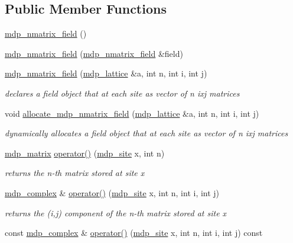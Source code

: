 \subsection*{Public Member Functions}
\begin{DoxyCompactItemize}
\item 
\hyperlink{classmdp__nmatrix__field_a2431fcb07b72317d2bf87e46ddad80b1}{mdp\_\-nmatrix\_\-field} ()
\item 
\hyperlink{classmdp__nmatrix__field_a8a3db6bfa6ffc2a5679c24f3e297e0c4}{mdp\_\-nmatrix\_\-field} (\hyperlink{classmdp__nmatrix__field}{mdp\_\-nmatrix\_\-field} \&field)
\item 
\hyperlink{classmdp__nmatrix__field_a10d00272d103d471a1cd9e5921d39419}{mdp\_\-nmatrix\_\-field} (\hyperlink{classmdp__lattice}{mdp\_\-lattice} \&a, int n, int i, int j)
\begin{DoxyCompactList}\small\item\em declares a field object that at each site as vector of n ixj matrices \item\end{DoxyCompactList}\item 
void \hyperlink{classmdp__nmatrix__field_ad8803e7b0f9a755329a1d7335ac0c019}{allocate\_\-mdp\_\-nmatrix\_\-field} (\hyperlink{classmdp__lattice}{mdp\_\-lattice} \&a, int n, int i, int j)
\begin{DoxyCompactList}\small\item\em dynamically allocates a field object that at each site as vector of n ixj matrices \item\end{DoxyCompactList}\item 
\hyperlink{classmdp__matrix}{mdp\_\-matrix} \hyperlink{classmdp__nmatrix__field_a389126da9ddf86d42b27d4d9d20245f8}{operator()} (\hyperlink{classmdp__site}{mdp\_\-site} x, int n)
\begin{DoxyCompactList}\small\item\em returns the n-\/th matrix stored at site x \item\end{DoxyCompactList}\item 
\hyperlink{classmdp__complex}{mdp\_\-complex} \& \hyperlink{classmdp__nmatrix__field_ab166e6abe76fcafd63dec9739da8324c}{operator()} (\hyperlink{classmdp__site}{mdp\_\-site} x, int n, int i, int j)
\begin{DoxyCompactList}\small\item\em returns the (i,j) component of the n-\/th matrix stored at site x \item\end{DoxyCompactList}\item 
const \hyperlink{classmdp__complex}{mdp\_\-complex} \& \hyperlink{classmdp__nmatrix__field_a4898cffa6a8e35bece4ed99a49499f3f}{operator()} (\hyperlink{classmdp__site}{mdp\_\-site} x, int n, int i, int j) const 
\end{DoxyCompactItemize}
